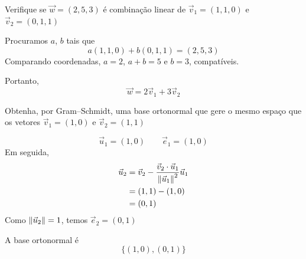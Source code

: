 \documentclass[a4paper,12pt,fleqn]{article}
\begin{document}
Verifique se $\vec{w}=(2, 5, 3)$
é combinação linear de $\vec{v}_1 = (1, 1, 0)$ e $\vec{v}_2=(0,1,1)$

\begin{answer}
  Procuramos $a$, $b$ tais que
  \[
    a(1,1,0)+b(0,1,1)=(2,5,3)
  \]
  Comparando coordenadas, $a=2$, $a+b=5$ e $b=3$, compatíveis.

  Portanto,
  \[
    \vec{w} = 2\vec{v}_1 + 3\vec{v}_2
  \]
\end{answer}

Obtenha, por Gram--Schmidt, uma base ortonormal que gere o mesmo espaço
que os vetores
$\vec{v}_1 = (1, 0)$ e
$\vec{v}_2 = (1, 1)$

\begin{answer}
  \[
    \vec{u}_1 = (1, 0)
    \qquad
    \vec{e}_1 = (1, 0)
  \]
  Em seguida,
  \begin{align*}
    \vec{u}_2 & =\vec{v}_2-\frac{\vec{v}_2\cdot\vec{u}_1}{\norm{\vec{u}_1}^{2}}\vec{u}_1 \\
              & =(1, 1) - (1, 0)                                                         \\
              & =(0, 1)
  \end{align*}
  Como $\norm{\vec{u}_2} = 1$, temos $\vec{e}_2 = (0, 1)$

  A base ortonormal é
  \[
    \{(1, 0), (0, 1)\}
  \]
\end{answer}

\end{document}
